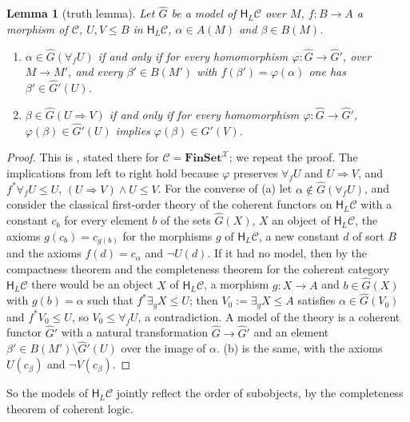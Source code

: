 \documentclass[11pt]{amsart}
\newtheorem{lem}[thm]{Lemma}
\theoremstyle{definition}
\newcommand{\Fin}{\mathbf{FinSet}}
\newcommand{\HH}{\mathsf H}
\newcommand{\cX}{\mathcal X}
\newcommand{\cC}{\mathcal C}
\begin{document}
\begin{lem}[truth lemma]\label{lem:truth}
Let $\hat G$ be a model of $\HH_L\cC$ over $M$, $f\colon B\to A$ a
morphism of $\cC$, $U,V\le B$ in $\HH_L\cC$, $\alpha\in A(M)$ and
$\beta\in B(M)$.
\begin{enumerate}
\item[(a)] $\alpha\in\hat G(\forall_fU)$ if and only if for every
homomorphism $\varphi\colon\hat G\to\hat G'$, over $M\to M'$, and
every $\beta'\in B(M')$ with $f(\beta')=\varphi(\alpha)$ one has
$\beta'\in\hat G'(U)$.
\item[(b)] $\beta\in\hat G(U\Rightarrow V)$ if and only if for every
homomorphism $\varphi\colon\hat G\to\hat G'$, $\varphi(\beta)\in
\hat G'(U)$ implies $\varphi(\beta)\in\hat G'(V)$.
\end{enumerate}
\end{lem}
\begin{proof}
This is \cite[Lemma~2.2]{Strings}, stated there for $\cC=\Fin^{\cX}$;
we repeat the proof. The implications from left to right hold because
$\varphi$ preserves $\forall_fU$ and $U\Rightarrow V$, and
$f^*\forall_fU\le U$, $(U\Rightarrow V)\wedge U\le V$. For the
converse of (a) let $\alpha\notin\hat G(\forall_fU)$, and consider the
classical first-order theory of the coherent functors on $\HH_L\cC$
with a constant $c_b$ for every element $b$ of the sets $\hat G(X)$,
$X$ an object of $\HH_L\cC$, the axioms $g(c_b)=c_{g(b)}$ for the
morphisms $g$ of $\HH_L\cC$, a new constant $d$ of sort $B$ and the
axioms $f(d)=c_\alpha$ and $\neg U(d)$. If it had no model, then by
the compactness theorem and the completeness theorem for the coherent
category $\HH_L\cC$ there would be an object $X$ of $\HH_L\cC$, a
morphism $g\colon X\to A$ and $b\in\hat G(X)$ with $g(b)=\alpha$ such
that $f^*\exists_gX\le U$; then $V_0:=\exists_gX\le A$ satisfies
$\alpha\in\hat G(V_0)$ and $f^*V_0\le U$, so
$V_0\le\forall_fU$, a contradiction. A model of the theory is a
coherent functor $\hat G'$ with a natural transformation $\hat G\to
\hat G'$ and an element $\beta'\in B(M')\setminus\hat G'(U)$ over the
image of $\alpha$. (b) is the same, with the axioms $U(c_\beta)$ and
$\neg V(c_\beta)$.
\end{proof}

So the models of $\HH_L\cC$ jointly reflect the order of subobjects,
by the completeness theorem of coherent logic.
\end{document}
